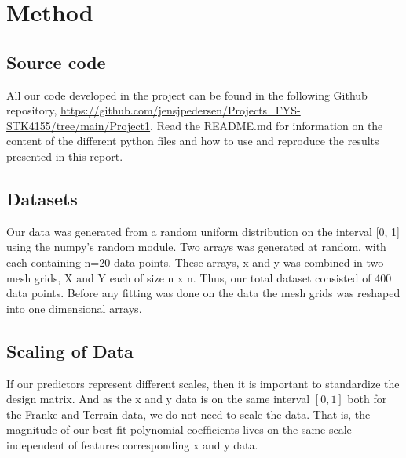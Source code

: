 \section{Method}



\subsection{Source code}
All our code developed in the project can be found in the following Github
repository, \url{https://github.com/jensjpedersen/Projects_FYS-STK4155/tree/main/Project1}. Read the README.md for information on the content of the
different python files and how to use and reproduce the results presented in
this report.  


\subsection{Datasets}
Our data was generated from a random uniform distribution on the interval [0,
1] using the numpy's random module. Two arrays was generated at random, with each containing n=20 data points. 
These arrays, x and y was combined in two mesh grids, X and Y each of size n x n. Thus, our
total dataset consisted of 400 data points. Before any fitting was done on the
data the mesh grids was reshaped into one dimensional arrays.  

\subsection{Scaling of Data}

If our
predictors represent different scales, then it is important to standardize the
design matrix. 
And as the x and y data is on the same interval $[0, 1]$ both for the Franke
and Terrain data, we do
not need to scale the data. That is, the magnitude of our best fit polynomial
coefficients lives on the same scale independent of features corresponding x
and y data. 


